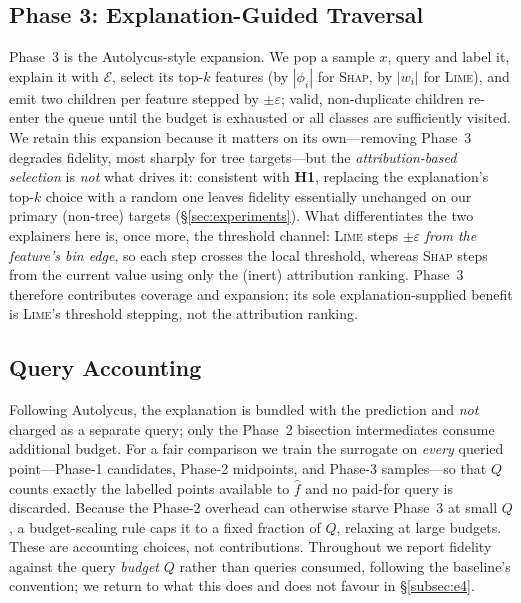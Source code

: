 \documentclass[sigconf,anonymous,review]{acmart}
\begin{document}
\subsection{Phase 3: Explanation-Guided Traversal}
Phase~3 is the Autolycus-style expansion. We pop a sample $x$, query and label it,
explain it with $\mathcal{E}$, select its top-$k$ features (by $|\phi_i|$ for
\textsc{Shap}, by $|w_i|$ for \textsc{Lime}), and emit two children per feature stepped
by $\pm\varepsilon$; valid, non-duplicate children re-enter the queue until the budget is
exhausted or all classes are sufficiently visited. We retain this expansion because it
matters on its own---removing Phase~3 degrades fidelity, most sharply for tree
targets---but the \emph{attribution-based selection} is \emph{not} what drives it:
consistent with \textbf{H1}, replacing the explanation's top-$k$ choice with a random one
leaves fidelity essentially unchanged on our primary (non-tree) targets
(\S\ref{sec:experiments}). What differentiates the two explainers here is, once more, the
threshold channel: \textsc{Lime} steps $\pm\varepsilon$ \emph{from the feature's bin
edge}, so each step crosses the local threshold, whereas \textsc{Shap} steps from the
current value using only the (inert) attribution ranking. Phase~3 therefore contributes
coverage and expansion; its sole explanation-supplied benefit is \textsc{Lime}'s
threshold stepping, not the attribution ranking.

\subsection{Query Accounting}
\label{subsec:accounting}
Following Autolycus, the explanation is bundled with the prediction and \emph{not} charged as a
separate query; only the Phase~2 bisection intermediates consume additional budget. For a fair
comparison we train the surrogate on \emph{every} queried point---Phase-1 candidates, Phase-2
midpoints, and Phase-3 samples---so that $Q$ counts exactly the labelled points available to
$\hat{f}$ and no paid-for query is discarded. Because the Phase-2 overhead can otherwise starve
Phase~3 at small $Q$, a budget-scaling rule caps it to a fixed fraction of $Q$, relaxing at large
budgets. These are accounting choices, not contributions. Throughout we report fidelity against the
query \emph{budget} $Q$ rather than queries consumed, following the baseline's convention; we return
to what this does and does not favour in \S\ref{subsec:e4}.

\end{document}
